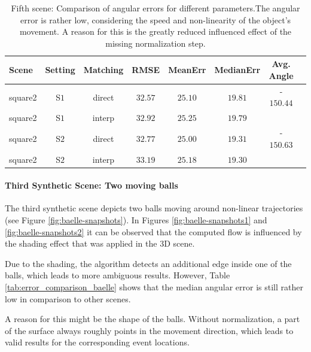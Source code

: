 \begin{table}[tb]
	\centering
		\begin{tabular}{lccccccc}
Scene & Setting & Matching & RMSE & MeanErr & MedianErr & Avg. Angle \\
\hline  \hline
square2 & S$1$ & direct & $32.57$ & $25.10$ & $19.81$ & -$150.44$ & \\
square2 & S$1$ & interp & $32.92$ & $25.25$ & $19.79$ &  & \\
square2 & S$2$ & direct & $32.77$ & $25.00$ & $19.31$ & -$150.63$ & \\
square2 & S$2$ & interp & $33.19$ & $25.18$ & $19.30$ &  & \\
		\end{tabular}
	\caption[Fifth scene: Comparison of angular errors for different parameters.]{Fifth scene: Comparison of angular errors for different parameters.The angular error is rather low, considering the speed and non-linearity of the object's movement.
	A reason for this is the greatly reduced influenced effect of the missing normalization step.}
	\label{tab:error_comparison_square2}
\end{table}

\paragraph{Third Synthetic Scene: Two moving balls}

The third synthetic scene depicts two balls moving around non-linear trajectories (see Figure \ref{fig:baelle-snapshots}). 
In Figures \ref{fig:baelle-snapshots1} and \ref{fig:baelle-snapshots2} it can be observed that the computed flow is influenced by the shading effect that was applied in the 3D scene. 

Due to the shading, the algorithm detects an additional edge inside one of the balls, which leads to more ambiguous results.
However, Table \ref{tab:error_comparison_baelle} shows that the median angular error is still rather low in comparison to other scenes.

A reason for this might be the shape of the balls. 
Without normalization, a part of the surface always roughly points in the movement direction, which leads to valid results for the corresponding event locations.

